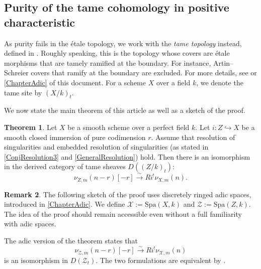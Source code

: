 \documentclass{amsart}
\def\Spa{\textrm{Spa}}
\theoremstyle{definition}
\newtheorem{theorem}{Theorem}[section]
\newtheorem{remark}[theorem]{Remark}
\numberwithin{equation}{section}
\begin{document}
\subsection{Purity of the tame cohomology in positive characteristic}
As purity fails in the \'etale topology, we  work  with the \emph{tame topology} instead, defined in \cite{HSTame}. Roughly speaking, this is the topology whose covers are \'etale morphisms that are tamely ramified at the boundary. For instance, Artin--Schreier covers that ramify at the boundary are excluded. For more details, see \cite{HSTame} or \cref{ChapterAdic} of this document. For a scheme $X$ over a field $k$, we denote the tame site by $(X/k)_t$.

We now state the main theorem of this article as well as a sketch of the proof.

\begin{theorem}\label{MainTheorem}
Let $X$ be a smooth scheme over a perfect field $k$. Let $i: Z \hookrightarrow X$ be a smooth closed immersion of pure codimension $r$. Assume that resolution of singularities and embedded resolution of singularities (as stated in \cref{ConjResolution3} and \cref{GeneralResolution}) hold. Then there is an isomorphism in the derived category of tame sheaves $D((Z/k)_t)$:
\[
\nu_{Z, m}(n - r)[-r] \xrightarrow{\sim} Ri^! \nu_{X, m}(n).
\]
\end{theorem}
\begin{remark}
	The following sketch of the proof uses discretely ringed adic spaces, introduced in \cref{ChapterAdic}. We define $\mathcal{X} := \Spa(X, k)$ and $\mathcal{Z} := \Spa(Z, k)$. The idea of the proof should remain accessible even without a full familiarity with adic spaces.

	
	The adic version of the theorem states that
	\[
	\nu_{\mathcal{Z}, m}(n - r)[-r] \xrightarrow{\sim} Ri^! \nu_{\mathcal{X}, m}(n)
	\]
	is an isomorphism in $D(\mathcal{Z}_t)$. The two formulations are equivalent by \cite[§14]{HSTame}.
\end{remark}
\end{document}
